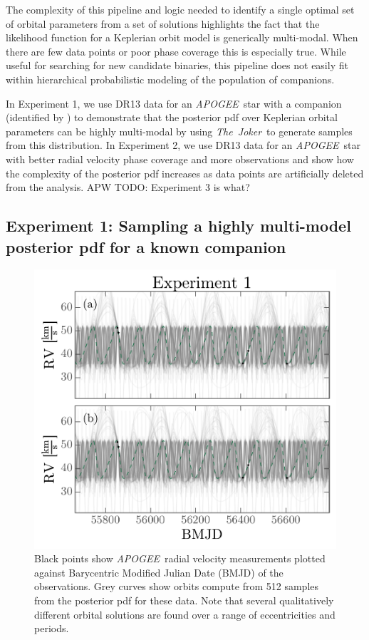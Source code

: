 \documentclass[12pt, preprint]{aastex6}
\newcommand{\project}[1]{\textsl{#1}}
\newcommand{\acronym}[1]{{\small{#1}}}
\newcommand{\apogee}{\project{\acronym{APOGEE}}}
\newcommand{\samplername}{\project{The~Joker}}
\newcommand{\todoapw}[1]{{\color{red}APW TODO: #1}}
\begin{document}
The complexity of this pipeline and logic needed to identify a single optimal
set of orbital parameters from a set of solutions highlights the fact that the
likelihood function for a Keplerian orbit model is generically multi-modal.
When there are few data points or poor phase coverage this is especially true.
While useful for searching for new candidate binaries, this pipeline does not
easily fit within hierarchical probabilistic modeling of the population of
companions.

In Experiment 1, we use DR13 data for an \apogee\ star with a companion
(identified by \citealt{Troup:2016}) to demonstrate that the posterior pdf over
Keplerian orbital parameters can be highly multi-modal by using \samplername\ to
generate samples from this distribution.
In Experiment 2, we use DR13 data for an \apogee\ star with better radial
velocity phase coverage and more observations and show how the complexity of the
posterior pdf increases as data points are artificially deleted from the
analysis.
\todoapw{Experiment 3 is what?}

\subsection{Experiment 1: Sampling a highly multi-model posterior pdf for a
known companion}

\begin{figure}[p]
\begin{center}
\includegraphics[width=\textwidth]{figures/exp1-rv-curves.pdf}
\end{center}
\caption{%
Black points show \apogee\ radial velocity measurements plotted against
Barycentric Modified Julian Date (BMJD) of the observations.
Grey curves show orbits compute from 512 samples from the posterior pdf for
these data.
Note that several qualitatively different orbital solutions are found over a
range of eccentricities and periods.
\label{fig:exp1-rv}}
\end{figure}
\end{document}
